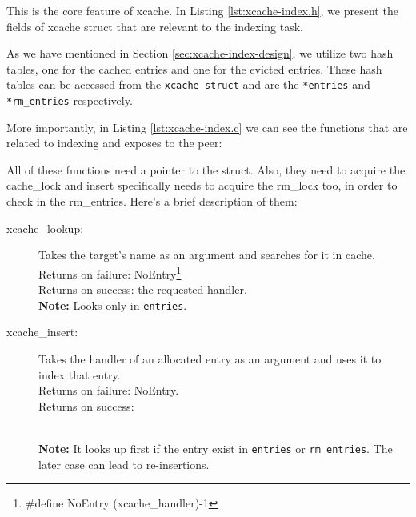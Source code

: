 This is the core feature of xcache. In Listing \ref{lst:xcache-index.h}, we 
present the fields of xcache struct that are relevant to the indexing task.


As we have mentioned in Section \ref{sec:xcache-index-design}, we utilize two 
hash tables, one for the cached entries and one for the evicted entries. These 
hash tables can be accessed from the \texttt{xcache struct} and are the 
\texttt{*entries} and \texttt{*rm\_entries} respectively.

More importantly, in Listing \ref{lst:xcache-index.c} we can see the functions 
that are related to indexing and \xcache exposes to the peer:


All of these functions need a pointer to the \xcache struct. Also, they need to 
acquire the cache\_lock and insert specifically needs to acquire the rm\_lock 
too, in order to check in the rm\_entries.  Here's a brief description of them:

\begin{description}
	\item[xcache\_lookup:]
		Takes the target's name as an argument and searches for it in 
		cache.\\
		Returns on failure: NoEntry\footnote{\#define NoEntry 
			(xcache\_handler)-1}\\
		Returns on success: the requested handler.\\
		\textbf{Note:} Looks only in \texttt{entries}.
	\item[xcache\_insert:]
		Takes the handler of an allocated entry as an argument and uses 
		it to index that entry.\\
		Returns on failure: NoEntry.\\
		Returns on success:
		\\
		\textbf{Note:} It looks up first if the entry exist in 
		\texttt{entries} or \texttt{rm\_entries}. The later case can 
		lead to re-insertions.
		\begin{comment}
			Probably not needed
		\item[xcache\_remove:]
			Takes the handler of an allocated entry as an argument and uses 
			it to remove that entry.\\
			Returns on failure: -1.
			Returns on success: 0.
			\textbf{Note:} Removes entries only from \texttt{entries} hash 
			table.
		\end{comment}
\end{description}

